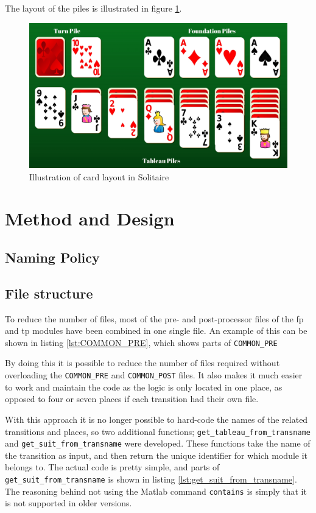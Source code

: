 \documentclass[runningheads,a4paper]{llncs}
\newcommand{\GPenSIM}{../GPenSIM}
\begin{document}
The layout of the piles is illustrated in figure \ref{fig:illuatration_solitaire}.
\begin{figure}
	\includegraphics[trim=150 0 0 0, scale=0.3]{images/TableauPiles}
	\caption{Illustration of card layout in Solitaire}
	\label{fig:illuatration_solitaire}
\end{figure}


\section{Method and Design}
\label{sec:2_method_and_design}
\subsection{Naming Policy}
\subsection{File structure}
\label{sec:2_file_structure}
To reduce the number of files, most of the pre- and post-processor files of the \ac{fp} and \ac{tp} modules have been combined in one single file. An example of this can be shown in listing \ref{lst:COMMON_PRE}, which shows parts of \verb!COMMON_PRE!


By doing this it is possible to reduce the number of files required without overloading the \verb!COMMON_PRE! and \verb!COMMON_POST! files. It also makes it much easier to work and maintain the code as the logic is only located in one place, as opposed to four or seven places if each transition had their own file.
\newline

With this approach it is no longer possible to hard-code the names of the related transitions and places, so two additional functions; \verb!get_tableau_from_transname! and \verb!get_suit_from_transname! were developed. These functions take the name of the transition as input, and then return the unique identifier for which module it belongs to. The actual code is pretty simple, and parts of \verb!get_suit_from_transname! is shown in listing \ref{lst:get_suit_from_transname}. The reasoning behind not using the Matlab command \verb!contains! is simply that it is not supported in older versions.

\clearpage
\end{document}
